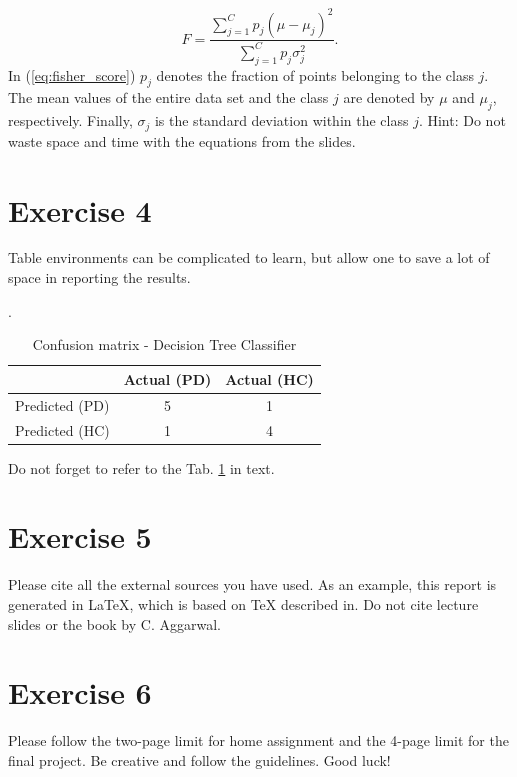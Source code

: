 \documentclass[twocolumn]{article}
\begin{document}
\begin{equation}\label{eq:fisher_score}
    F = \displaystyle{\frac{\displaystyle{\sum _{j=1} ^ C p_j (\mu - \mu _j) ^2}}{\displaystyle{\sum _ {j=1} ^C} p_j \sigma _j ^2}}.
\end{equation}
In (\ref{eq:fisher_score}) $p_j$ denotes the fraction of points belonging to the class $j$. The mean values of the entire data set and the class $j$ are denoted by $\mu$ and $\mu _j$, respectively. Finally, $\sigma _j$ is the standard deviation within the class $j$. Hint: Do not waste space and time with the equations from the slides.
\section{Exercise 4}
Table environments can be complicated to learn, but allow one to save a lot of space in reporting the results.
\begin{table}[h]
\centering
\caption{Confusion matrix - Decision Tree Classifier}\label{tab:DT_confusion}.
\begin{tabular}{|l|c|c|}
\hline
{} &   Actual (PD) & Actual (HC) \\
\hline
Predicted (PD)         &  5 &      1 \\
\hline
Predicted (HC)         &  1 &      4 \\
\hline
\end{tabular}
\end{table}
Do not forget to refer to the Tab. \ref{tab:DT_confusion} in text.

\section{Exercise 5}
Please cite all the external sources you have used. As an example, this report is generated in \LaTeX \cite{latex2e}, which is based on \TeX{} described in\cite{texbook}. Do not cite lecture slides or the book by C. Aggarwal.

\section{Exercise 6}
Please follow the two-page limit for home assignment and the 4-page limit for the final project. Be creative and follow the guidelines. Good luck!

\end{document}
